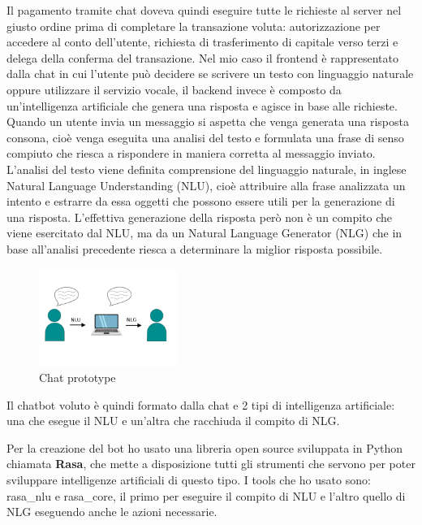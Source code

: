 Il pagamento tramite chat doveva quindi eseguire tutte le richieste al server nel giusto ordine prima di completare la transazione voluta: autorizzazione per accedere al conto dell'utente, richiesta di trasferimento di capitale verso terzi e delega della conferma del transazione.
Nel mio caso il frontend è rappresentato dalla chat in cui l'utente può decidere se scrivere un testo con linguaggio naturale oppure utilizzare il servizio vocale, il backend invece è composto da un'intelligenza artificiale che genera una risposta e agisce in base alle richieste.
Quando un utente invia un messaggio si aspetta che venga generata una risposta consona, cioè venga eseguita una analisi del testo e formulata una frase di senso compiuto che riesca a rispondere in maniera corretta al messaggio inviato.
L'analisi del testo viene definita comprensione del linguaggio naturale, in inglese Natural Language Understanding (NLU), cioè attribuire alla frase analizzata un intento e estrarre da essa oggetti che possono essere utili per la generazione di una risposta.
L'effettiva generazione della risposta però non è un compito che viene esercitato dal NLU, ma da un Natural Language Generator (NLG) che in base all'analisi precedente riesca a determinare la miglior risposta possibile.
\begin{figure}[H]
 \centering
    \includegraphics[width=0.4\textwidth]{img/nlu_nlg.png}
 \caption{Chat prototype}
\end{figure}
Il chatbot voluto è quindi formato dalla chat e 2 tipi di intelligenza artificiale: una che esegue il NLU e un'altra che racchiuda il compito di NLG.

Per la creazione del bot ho usato una libreria open source sviluppata in Python chiamata \textbf{Rasa}, che mette a disposizione tutti gli strumenti che servono per poter sviluppare intelligenze artificiali di questo tipo. I tools che ho usato sono: rasa\_nlu e rasa\_core, il primo per eseguire il compito di NLU e l'altro quello di NLG eseguendo anche le azioni necessarie.

